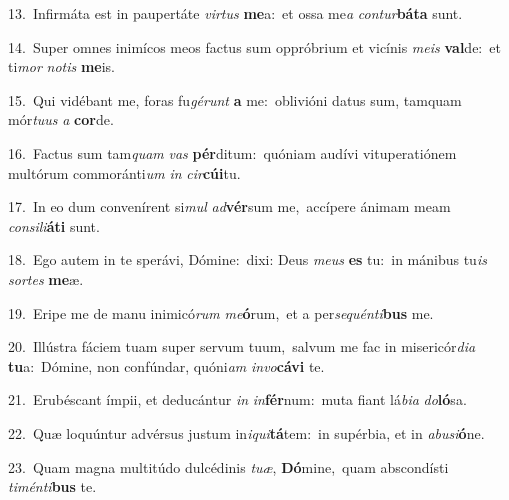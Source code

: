 {\numbfont\textcolor{\numbcolor}{13.}}~Infirmáta est in paupertáte \textit{vir}\-\textit{tus} \textbf{me}\-a:~\star et ossa me\textit{a} \textit{con}\-\textit{tur}\textbf{bá}\textbf{ta} sunt.\par
{\numbfont\textcolor{\numbcolor}{14.}}~Super omnes inimícos meos factus sum oppróbrium et vicínis \textit{me}\-\textit{is} \textbf{val}\-de:~\star et ti\textit{mor} \textit{no}\-\textit{tis} \textbf{me}\-is.\par
{\numbfont\textcolor{\numbcolor}{15.}}~Qui vidébant me, foras fu\-\textit{gé}\-\textit{runt} \textbf{a} me:~\star oblivióni datus sum, tamquam mór\-\textit{tu}\-\textit{us} \textit{a} \textbf{cor}\-de.\par
{\numbfont\textcolor{\numbcolor}{16.}}~Factus sum tam\textit{quam} \textit{vas} \textbf{pér}\-ditum:~\star quóniam audívi vituperatiónem multórum commoránti\textit{um} \textit{in} \textit{cir}\-\textbf{cú}\textbf{i}tu.\par
{\numbfont\textcolor{\numbcolor}{17.}}~In eo dum convenírent si\textit{mul} \textit{ad}\-\textbf{vér}sum me,~\star accípere ánimam meam \textit{con}\-\textit{si}\textit{li}\textbf{á}\textbf{ti} sunt.\par
{\numbfont\textcolor{\numbcolor}{18.}}~Ego autem in te sperávi, Dómine:~\dagger dixi: Deus \textit{me}\-\textit{us} \textbf{es} tu:~\star in mánibus tu\textit{is} \textit{sor}\-\textit{tes} \textbf{me}\-æ.\par
{\numbfont\textcolor{\numbcolor}{19.}}~Eripe me de manu inimicó\textit{rum} \textit{me}\-\textbf{ó}rum,~\star et a per\-\textit{se}\-\textit{quén}\textit{ti}\textbf{bus} me.\par
{\numbfont\textcolor{\numbcolor}{20.}}~Illústra fáciem tuam super servum tuum,~\dagger salvum me fac in misericór\-\textit{di}\-\textit{a} \textbf{tu}\-a:~\star Dómine, non confúndar, quóni\textit{am} \textit{in}\-\textit{vo}\textbf{cá}\textbf{vi} te.\par
{\numbfont\textcolor{\numbcolor}{21.}}~Erubéscant ímpii, et deducántur \textit{in} \textit{in}\-\textbf{fér}num:~\star muta fiant lá\-\textit{bi}\-\textit{a} \textit{do}\-\textbf{ló}sa.\par
{\numbfont\textcolor{\numbcolor}{22.}}~Quæ loquúntur advérsus justum in\-\textit{i}\-\textit{qui}\textbf{tá}tem:~\star in supérbia, et in \textit{ab}\-\textit{u}\textit{si}\textbf{ó}ne.\par
{\numbfont\textcolor{\numbcolor}{23.}}~Quam magna multitúdo dulcédinis \textit{tu}\-\textit{æ}, \textbf{Dó}\-mine,~\star quam abscondísti \textit{ti}\-\textit{mén}\textit{ti}\textbf{bus} te.\par
